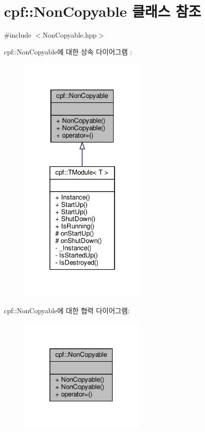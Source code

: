 \hypertarget{classcpf_1_1_non_copyable}{}\section{cpf\+:\+:Non\+Copyable 클래스 참조}
\label{classcpf_1_1_non_copyable}


{\ttfamily \#include $<$Non\+Copyable.\+hpp$>$}



cpf\+:\+:Non\+Copyable에 대한 상속 다이어그램 \+: \nopagebreak
\begin{figure}[H]
\begin{center}
\leavevmode
\includegraphics[width=178pt]{classcpf_1_1_non_copyable__inherit__graph}
\end{center}
\end{figure}


cpf\+:\+:Non\+Copyable에 대한 협력 다이어그램\+:\nopagebreak
\begin{figure}[H]
\begin{center}
\leavevmode
\includegraphics[width=175pt]{classcpf_1_1_non_copyable__coll__graph}
\end{center}
\end{figure}
